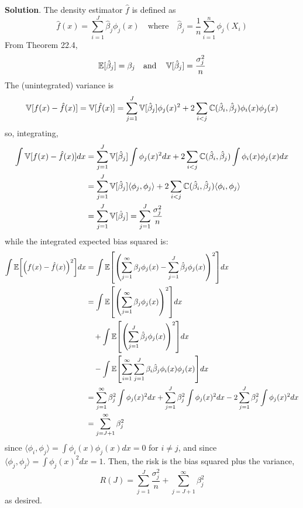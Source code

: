 \textbf{Solution}.
The density estimator \(\hat{f}\) is defined as
\[
\hat{f}(x) = \sum_{i=1}^J \hat{\beta}_{j} \phi_{j}(x) 
\quad \text{where} \quad
\hat{\beta}_{j} = \frac{1}{n} \sum_{i=1}^{n} \phi_{j}(X_{i})
\]
From Theorem 22.4,
\[
\operatorname{\mathbb{E}}[\hat{\beta}_{j}] = \beta_{j}
\quad \text{and} \quad
\operatorname{\mathbb{V}}[\hat{\beta}_{j}] = \frac{\sigma_{j}^{2}}{n}
\]
The (unintegrated) variance is
\[
\operatorname{\mathbb{V}}[f(x) - \hat{f}(x)] = \operatorname{\mathbb{V}}[\hat{f}(x)] 
= \sum_{j=1}^J \operatorname{\mathbb{V}}[\hat{\beta}_{j}]\phi_{j}(x)^{2} + 2 \sum_{i < j} \operatorname{\mathbb{C}}(\hat{\beta}_{i}, \hat{\beta}_{j}) \phi_{i}(x) \phi_{j}(x)
\]
so, integrating,
\begin{align*}
\int \operatorname{\mathbb{V}}[f(x) - \hat{f}(x)] dx &= \sum_{j=1}^J \operatorname{\mathbb{V}}[\hat{\beta}_{j}] \int \phi_{j}(x)^{2} dx + 2 \sum_{i < j} \operatorname{\mathbb{C}}(\hat{\beta}_{i}, \hat{\beta}_{j}) \int \phi_{i}(x) \phi_{j}(x) dx  \\
&= \sum_{j=1}^J \operatorname{\mathbb{V}}[\hat{\beta}_{j}] \langle \phi_{j}, \phi_{j} \rangle + 2 \sum_{i < j} \operatorname{\mathbb{C}}(\hat{\beta}_{i}, \hat{\beta}_{j}) \langle \phi_{i}, \phi_{j} \rangle \\
&= \sum_{j=1}^J \operatorname{\mathbb{V}}[\hat{\beta}_{j}] = \sum_{j=1}^J \frac{\sigma_{j}^{2}}{n}
\end{align*}
while the integrated expected bias squared is:
\begin{align*}
\int \EXP\left[\left(f(x) - \hat{f}(x)\right)^{2}\right] dx
&= \int \EXP\left[\left(\sum_{j=1}^{\infty} \beta_{j} \phi_{j}(x) - \sum_{j=1}^J \hat{\beta}_{j} \phi_{j}(x)\right)^{2}\right] dx 
\\
&= \int \EXP \left[ \left(\sum_{j=1}^{\infty} \beta_{j} \phi_{j}(x)\right)^{2} \right] dx
\\&\quad
+ \int \EXP \left[ \left(\sum_{j=1}^J \hat{\beta}_{j} \phi_{j}(x)\right)^{2} \right] dx
\\&\quad
- \int \EXP \left[ \sum_{i=1}^{\infty} \sum_{j=1}^J \beta_{i} \hat{\beta}_{j} \phi_{i}(x) \phi_{j}(x) \right] dx 
\\
&= \sum_{j=1}^{\infty} \beta_{j}^{2} \int \phi_{j}(x)^{2} dx 
+ \sum_{j=1}^J \beta_{j}^{2} \int \phi_{j}(x)^{2} dx 
- 2 \sum_{j=1}^J \beta_{j}^{2} \int \phi_{j}(x)^{2} dx 
\\
&= \sum_{j=J+1}^{\infty} \beta_{j}^{2}
\end{align*}
since
\(\langle \phi_{i}, \phi_{j} \rangle = \int \phi_{i}(x) \phi_{j}(x) dx = 0\) for
\(i \neq j\), and since
\(\langle \phi_{j}, \phi_{j} \rangle = \int \phi_{j}(x)^{2} dx = 1\).
Then, the risk is the bias squared plus the variance,
\[
R(J) = \sum_{j=1}^J \frac{\sigma_{j}^{2}}{n} + \sum_{j=J+1}^{\infty} \beta_{j}^{2}
\]
as desired.

